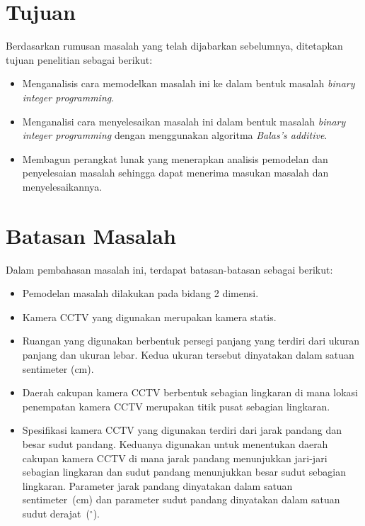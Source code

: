 \section{Tujuan}
\label{sec:tujuan}

Berdasarkan rumusan masalah yang telah dijabarkan sebelumnya, ditetapkan tujuan penelitian sebagai berikut:

\begin{itemize}
	\item Menganalisis cara memodelkan masalah ini ke dalam bentuk masalah \textit{binary integer programming}.
	\item Menganalisi cara menyelesaikan masalah ini dalam bentuk masalah \textit{binary integer programming} dengan menggunakan algoritma \textit{Balas's additive}.
	\item Membagun perangkat lunak yang menerapkan analisis pemodelan dan penyelesaian masalah sehingga dapat menerima masukan masalah dan menyelesaikannya.
\end{itemize}

\section{Batasan Masalah}
\label{sec:batasan}

Dalam pembahasan masalah ini, terdapat batasan-batasan sebagai berikut:

\begin{itemize}
	\item Pemodelan masalah dilakukan pada bidang 2 dimensi.
	\item Kamera CCTV yang digunakan merupakan kamera statis.
	\item Ruangan yang digunakan berbentuk persegi panjang yang terdiri dari ukuran panjang dan ukuran lebar. Kedua ukuran tersebut dinyatakan dalam satuan sentimeter (cm).
	\item Daerah cakupan kamera CCTV berbentuk sebagian lingkaran di mana lokasi penempatan kamera CCTV merupakan titik pusat sebagian lingkaran.
	\item Spesifikasi kamera CCTV yang digunakan terdiri dari jarak pandang dan besar sudut pandang. Keduanya digunakan untuk menentukan daerah cakupan kamera CCTV di mana jarak pandang menunjukkan jari-jari sebagian lingkaran dan sudut pandang menunjukkan besar sudut sebagian lingkaran. Parameter jarak pandang dinyatakan dalam satuan sentimeter~(cm) dan parameter sudut pandang dinyatakan dalam satuan sudut derajat~(\(^\circ\)).
\end{itemize}

